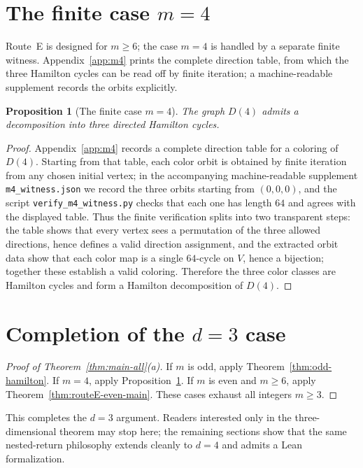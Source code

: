 \documentclass[11pt]{article}
\newtheorem{proposition}{Proposition}
\begin{document}
\section{The finite case $m=4$}\label{sec:m4}

Route~E is designed for $m\ge 6$; the case $m=4$ is handled by a separate finite witness.
Appendix~\ref{app:m4} prints the complete direction table, from which the three Hamilton cycles can be read off by finite iteration; a machine-readable supplement records the orbits explicitly.

\begin{proposition}[The finite case $m=4$]\label{prop:m4-main}
The graph $D(4)$ admits a decomposition into three directed Hamilton cycles.
\end{proposition}

\begin{proof}
Appendix~\ref{app:m4} records a complete direction table for a coloring of $D(4)$.
Starting from that table, each color orbit is obtained by finite iteration from any chosen initial vertex; in the accompanying machine-readable supplement \texttt{m4\_witness.json} we record the three orbits starting from $(0,0,0)$, and the script \texttt{verify\_m4\_witness.py} checks that each one has length $64$ and agrees with the displayed table.
Thus the finite verification splits into two transparent steps: the table shows that every vertex sees a permutation of the three allowed directions, hence defines a valid direction assignment, and the extracted orbit data show that each color map is a single $64$-cycle on $V$, hence a bijection; together these establish a valid coloring.
Therefore the three color classes are Hamilton cycles and form a Hamilton decomposition of $D(4)$.
\end{proof}


\section{Completion of the $d=3$ case}\label{sec:completion}

\begin{proof}[Proof of Theorem~\ref{thm:main-all}\textup{(a)}]
If $m$ is odd, apply Theorem~\ref{thm:odd-hamilton}.
If $m=4$, apply Proposition~\ref{prop:m4-main}.
If $m$ is even and $m\ge 6$, apply Theorem~\ref{thm:routeE-even-main}.
These cases exhaust all integers $m\ge 3$.
\end{proof}

This completes the $d=3$ argument.
Readers interested only in the three-dimensional theorem may stop here; the
remaining sections show that the same nested-return philosophy extends cleanly
to $d=4$ and admits a Lean formalization.
\end{document}
